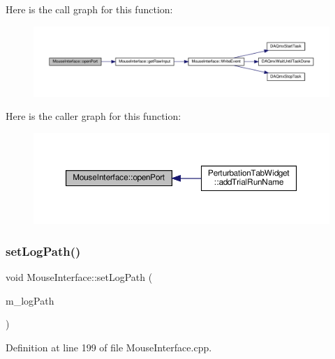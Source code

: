 Here is the call graph for this function\+:
\nopagebreak
\begin{figure}[H]
\begin{center}
\leavevmode
\includegraphics[width=350pt]{class_mouse_interface_afffa2b2ea4250fc392451c51497cf99a_cgraph}
\end{center}
\end{figure}
Here is the caller graph for this function\+:
\nopagebreak
\begin{figure}[H]
\begin{center}
\leavevmode
\includegraphics[width=350pt]{class_mouse_interface_afffa2b2ea4250fc392451c51497cf99a_icgraph}
\end{center}
\end{figure}
\mbox{\label{class_mouse_interface_ae0058db1b8c881a51c446518cdf992d7}} 
\subsubsection{\texorpdfstring{set\+Log\+Path()}{setLogPath()}}
{\footnotesize\ttfamily void Mouse\+Interface\+::set\+Log\+Path (\begin{DoxyParamCaption}\item[{Q\+String}]{m\+\_\+log\+Path }\end{DoxyParamCaption})}



Definition at line 199 of file Mouse\+Interface.\+cpp.

